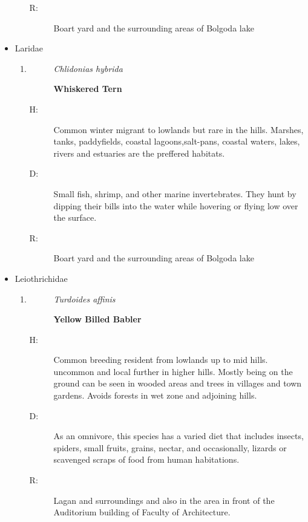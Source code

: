 \begin{itemize}
\begin{enumerate}
\begin{description}
\item[R: ]%
Boart yard and the surrounding areas of Bolgoda lake%
\end{description}%
\end{enumerate}%
\item%
Laridae%
\begin{enumerate}%
\item%
\begin{description}%
\item[]%
\textit{Chlidonias hybrida}%
\item[]%
\textbf{Whiskered Tern}%
\end{description}%
\begin{description}%
\item[H: ]%
Common winter migrant to lowlands but rare in the hills. Marshes, tanks, paddyfields, coastal lagoons,salt{-}pans, coastal waters, lakes, rivers and estuaries are the preffered habitats.%
\item[D: ]%
 Small fish, shrimp, and other marine invertebrates. They hunt by dipping their bills into the water while hovering or flying low over the surface.%
\item[R: ]%
Boart yard and the surrounding areas of Bolgoda lake%
\end{description}%
\end{enumerate}%
\item%
Leiothrichidae%
\begin{enumerate}%
\item%
\begin{description}%
\item[]%
\textit{Turdoides affinis}%
\item[]%
\textbf{Yellow Billed Babler}%
\end{description}%
\begin{description}%
\item[H: ]%
Common breeding resident from lowlands up to mid hills. uncommon and local further in higher hills. Mostly being on the ground can be seen in wooded areas and trees in villages and town gardens. Avoids forests in wet zone and adjoining hills. %
\item[D: ]%
As an omnivore, this species has a varied diet that includes insects, spiders, small fruits, grains, nectar, and occasionally, lizards or scavenged scraps of food from human habitations.%
\item[R: ]%
Lagan and surroundings and also in the area in front of the Auditorium building of Faculty of Architecture.%
\end{description}%

\end{enumerate}
\end{itemize}
